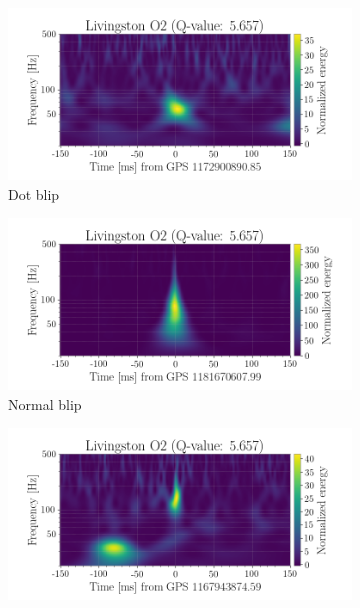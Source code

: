 \documentclass[a4paper]{article}
\begin{document}
\begin{figure}[h!]
	\centering
	\begin{subfigure}{.49\textwidth}
		\centering
		\includegraphics[width=1\linewidth]{dot_O2}
		\caption{Dot blip}
		\label{fig:dot_O2}
	\end{subfigure}
	\begin{subfigure}{.49\textwidth}
		\centering
		\includegraphics[width=1\linewidth]{normal_O2}
		\caption{Normal blip}
		\label{fig:normal_O2}
	\end{subfigure}
	\begin{subfigure}{.49\textwidth}
		\centering
		\includegraphics[width=1\linewidth]{double_O2}

\end{subfigure}
\end{figure}
\end{document}
